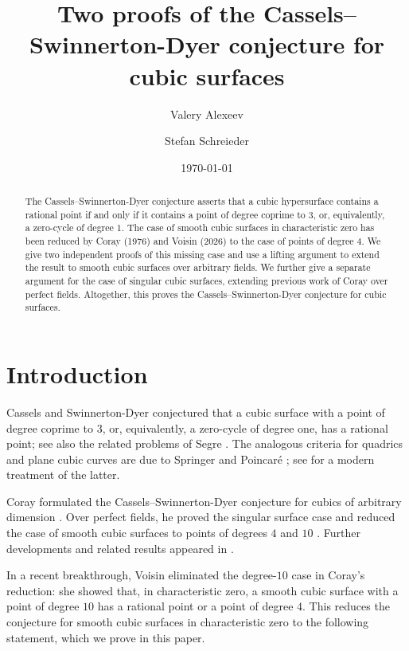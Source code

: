 \documentclass[a4paper,11pt]{amsart}
\title[The Cassels--Swinnerton-Dyer conjecture]{Two proofs of the Cassels--Swinnerton-Dyer conjecture for cubic surfaces}
\author{Valery Alexeev}
\author{Stefan Schreieder}
\date{\today}
\numberwithin{equation}{section}
\theoremstyle{definition}
\theoremstyle{remark}
\begin{document}
\begin{abstract}
The Cassels--Swinnerton-Dyer conjecture asserts that a cubic hypersurface contains a rational point if and only if it contains a point of degree coprime to $3$, or, equivalently, a zero-cycle of degree $1$.
The case of smooth cubic surfaces in characteristic zero has been reduced by Coray (1976) and Voisin (2026) to the case of points of degree $4$.
We give two independent proofs of this missing case and use a lifting argument 
to extend the result to smooth cubic surfaces over arbitrary fields.
We further give a 
separate 
argument for the case of singular cubic surfaces, extending previous work of Coray over perfect fields.
Altogether, this proves the Cassels--Swinnerton-Dyer conjecture for cubic surfaces.
\end{abstract}

\maketitle

\setcounter{tocdepth}{1}
\tableofcontents

\section{Introduction}\label{sec:introduction}

Cassels and Swinnerton-Dyer conjectured that a cubic surface with a point of degree coprime to $3$, or, equivalently, a zero-cycle of degree one, has a rational point; see also the related problems of Segre \cite[p.~2]{segre}. 
The analogous criteria for quadrics and plane cubic curves are due to Springer \cite{springer} and Poincar\'e \cite{poincare}; see \cite[Proposition~2.3]{coray} for a modern treatment of the latter.

Coray formulated the Cassels--Swinnerton-Dyer conjecture for cubics of arbitrary dimension \cite[Conjecture~(CS)]{coray}.
Over perfect fields, he proved the singular surface case \cite[Proposition~8.2]{coray} and reduced the case of smooth cubic surfaces to points of degrees $4$ and $10$ \cite[Theorem~7.1]{coray}.
Further developments and related results appeared in \cite{CoraySingular,CT-coray,CT-SD,BN,CT-zero-cycles,ma,rivera-viray,balestrieri,porzio-thesis}. 

In a recent breakthrough, Voisin \cite{voisin-coray} eliminated
the degree-$10$ case in Coray's reduction: she showed that,
in characteristic zero, a smooth cubic surface with a point
of degree $10$ has a rational point or a point of degree $4$.
This reduces the conjecture for smooth cubic surfaces in
characteristic zero to the following statement, which we
prove in this paper.
\end{document}
